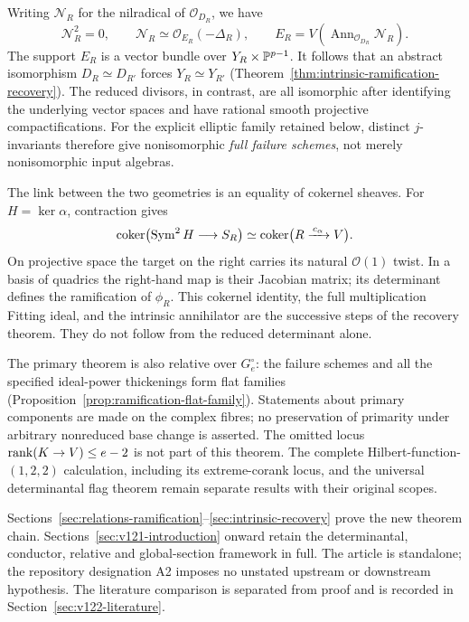 Writing $\mathcal N_R$ for the nilradical of $\mathcal O_{D_R}$, we have
\[
 \mathcal N_R^2=0,\qquad
 \mathcal N_R\simeq\mathcal O_{E_R}(-\Delta_R),\qquad
 E_R=V\!\left(\operatorname{Ann}_{\mathcal O_{D_R}}\mathcal N_R\right).
\]
The support $E_R$ is a vector bundle over $Y_R\times\mathbb P^{p-1}$.
It follows that an abstract isomorphism $D_R\simeq D_{R'}$ forces
$Y_R\simeq Y_{R'}$ (Theorem~\ref{thm:intrinsic-ramification-recovery}).
The reduced divisors, in contrast, are all isomorphic after identifying
the underlying vector spaces and have rational smooth projective
compactifications. For the explicit elliptic family retained below,
distinct $j$-invariants therefore give nonisomorphic \emph{full failure
schemes}, not merely nonisomorphic input algebras.

The link between the two geometries is an equality of cokernel sheaves.
For $H=\ker\alpha$, contraction gives
\[
 \operatorname{coker}\bigl(\operatorname{Sym}^2H\longrightarrow S_R\bigr)
 \simeq
 \operatorname{coker}\bigl(R\xrightarrow{\,c_\alpha\,}V\bigr).
\]
On projective space the target on the right carries its natural
$\mathcal O(1)$ twist. In a basis of quadrics the right-hand map is their
Jacobian matrix; its determinant defines the ramification of $\phi_R$.
This cokernel identity, the full multiplication Fitting ideal, and the
intrinsic annihilator are the successive steps of the recovery theorem.
They do not follow from the reduced determinant alone.

The primary theorem is also relative over $G_e^\circ$: the failure
schemes and all the specified ideal-power thickenings form flat families
(Proposition~\ref{prop:ramification-flat-family}). Statements about primary
components are made on the complex fibres; no preservation of primarity
under arbitrary nonreduced base change is asserted. The omitted locus
$\operatorname{rank}(K\to V)\le e-2$ is not part of this theorem. The complete
Hilbert-function-$(1,2,2)$ calculation, including its extreme-corank
locus, and the universal determinantal flag theorem remain separate
results with their original scopes.

Sections~\ref{sec:relations-ramification}--\ref{sec:intrinsic-recovery}
prove the new theorem chain. Sections~\ref{sec:v121-introduction} onward
retain the determinantal, conductor, relative and global-section
framework in full. The article is standalone; the repository designation
A2 imposes no unstated upstream or downstream hypothesis. The literature
comparison is separated from proof and is recorded in
Section~\ref{sec:v122-literature}.

